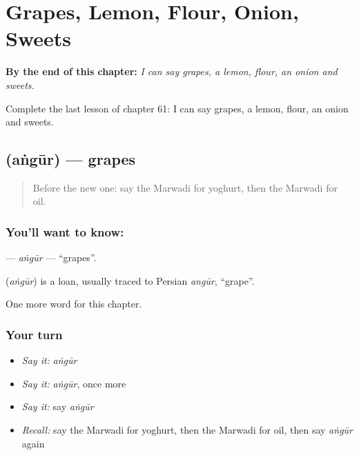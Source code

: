 
\chapter{Grapes, Lemon, Flour, Onion, Sweets}
\label{ch:mw-grapes-lemon-flour-onion-sweets}

\begin{chapteropening}
\textbf{By the end of this chapter:} \emph{I can say grapes, a lemon, flour, an onion and sweets.}

Complete the last lesson of chapter 61: I can say grapes, a lemon, flour, an onion and sweets.
\end{chapteropening}

\section[\texorpdfstring{\mw{अंगूर} (aṅgūr)}{अंगूर (aṅgūr)}]{ (aṅgūr) — grapes}

\label{lesson:MW-C61-angur}



\begin{quote}
Before the new one: say the Marwadi for yoghurt, then the Marwadi for oil.
\end{quote}

\subsection*{You'll want to know: }
\textbf{} — \emph{aṅgūr} — \textquotedblleft{}grapes\textquotedblright{}.

\begin{cousinweb}
\textbf{} (\emph{aṅgūr}) is a loan, usually traced to Persian \emph{angūr}, \textquotedblleft{}grape\textquotedblright{}.
\end{cousinweb}

\begin{grammarlens}[title={What you've built}]
One more word for this chapter.
\end{grammarlens}

\subsection*{Your turn}
\begin{itemize}
\raggedright
  \item \emph{Say it:} \emph{aṅgūr}
  \item \emph{Say it:} \emph{aṅgūr}, once more
  \item \emph{Say it:} say \emph{aṅgūr}
  \item \emph{Recall:} say the Marwadi for yoghurt, then the Marwadi for oil, then say \emph{aṅgūr} again
\end{itemize}

